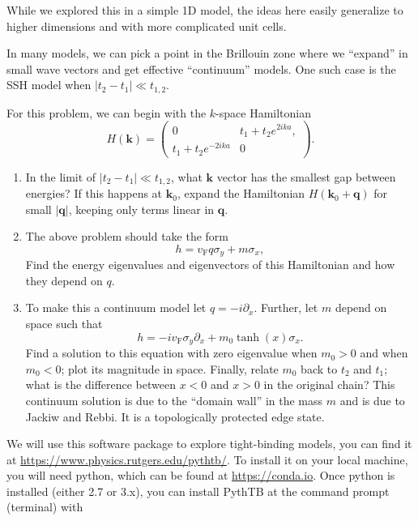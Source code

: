 \documentclass{cthhw}
\begin{document}
While we explored this in a simple 1D model, the ideas here easily generalize to higher dimensions and with more complicated unit cells.



In many models, we can pick a point in the Brillouin zone where we ``expand'' in small wave vectors and get effective ``continuum'' models.
One such case is the SSH model when $|t_{2}-t_{1}|\ll t_{1,2}$.

For this problem, we can begin with the $k$-space Hamiltonian
\begin{equation}
	\label{eq:2}
	H(\mathbf k) =
	\begin{pmatrix}
		0 & t_{1} + t_{2} e^{2 i  k a} ,\\
		t_{1} + t_{2} e^{-2 i k a}  & 0
	\end{pmatrix}.
\end{equation}
\begin{enumerate}
	\item In the limit of $|t_{2}-t_{1}|\ll t_{1,2}$, what $\mathbf k$ vector has the smallest gap between energies? If this happens at $\mathbf k_{0}$, expand the Hamiltonian $H(\mathbf k_{0} + \mathbf q)$  for small $|\mathbf q|$, keeping only terms linear in $\mathbf q$.
	\item The above problem should take the form
	\begin{equation}
		\label{eq:3}
		h = v_{\mathrm F} q \sigma_{y} + m \sigma_{x},
	\end{equation}
	Find the energy eigenvalues and eigenvectors of this Hamiltonian and how they depend on $q$.
	\item To make this a continuum model let $q = -i\partial_{x}$. Further, let $m$ depend on space such that
	\begin{equation}
		\label{eq:4}
		h = -i v_{\mathrm F} \sigma_{y} \partial_{x} + m_{0} \tanh(x) \sigma_{x}.
	\end{equation}
	Find a solution to this equation with zero eigenvalue when $m_{0}>0$ and when $m_{0}<0$;  plot its magnitude in space. Finally, relate $m_{0}$ back to $t_{2}$ and $t_{1}$; what is the difference between $x<0$ and $x>0$ in the original chain? This continuum solution is due to the ``domain wall'' in the mass $m$ and is due to Jackiw and Rebbi. It is a topologically protected edge state.
\end{enumerate}



We will use this software package to explore tight-binding models, you can find it at \url{https://www.physics.rutgers.edu/pythtb/}.
To install it on your local machine, you will need python, which can be found at \url{https://conda.io}. Once python is installed (either 2.7 or 3.x), you can install PythTB at the command prompt (terminal) with
\end{document}
